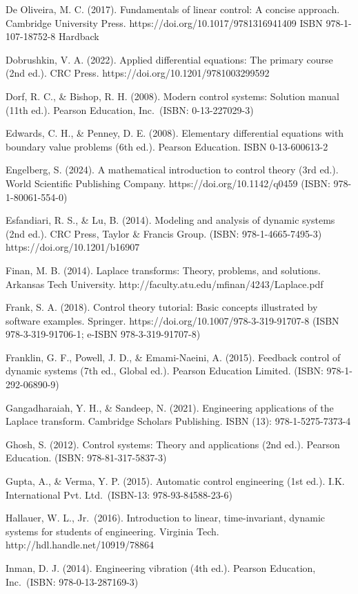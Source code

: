 \documentclass[
  11pt,
]{article}
\begin{document}
De Oliveira, M. C. (2017). Fundamentals of linear control: A concise
approach. Cambridge University Press.
https://doi.org/10.1017/9781316941409 ISBN 978-1-107-18752-8 Hardback

Dobrushkin, V. A. (2022). Applied differential equations: The primary
course (2nd ed.). CRC Press. https://doi.org/10.1201/9781003299592

Dorf, R. C., \& Bishop, R. H. (2008). Modern control systems: Solution
manual (11th ed.). Pearson Education, Inc.~(ISBN: 0-13-227029-3)

Edwards, C. H., \& Penney, D. E. (2008). Elementary differential
equations with boundary value problems (6th ed.). Pearson Education.
ISBN 0-13-600613-2

Engelberg, S. (2024). A mathematical introduction to control theory (3rd
ed.). World Scientific Publishing Company. https://doi.org/10.1142/q0459
(ISBN: 978-1-80061-554-0)

Esfandiari, R. S., \& Lu, B. (2014). Modeling and analysis of dynamic
systems (2nd ed.). CRC Press, Taylor \& Francis Group. (ISBN:
978-1-4665-7495-3) https://doi.org/10.1201/b16907

Finan, M. B. (2014). Laplace transforms: Theory, problems, and
solutions. Arkansas Tech University.
http://faculty.atu.edu/mfinan/4243/Laplace.pdf

Frank, S. A. (2018). Control theory tutorial: Basic concepts illustrated
by software examples. Springer.
https://doi.org/10.1007/978-3-319-91707-8 (ISBN 978-3-319-91706-1;
e-ISBN 978-3-319-91707-8)

Franklin, G. F., Powell, J. D., \& Emami-Naeini, A. (2015). Feedback
control of dynamic systems (7th ed., Global ed.). Pearson Education
Limited. (ISBN: 978-1-292-06890-9)

Gangadharaiah, Y. H., \& Sandeep, N. (2021). Engineering applications of
the Laplace transform. Cambridge Scholars Publishing. ISBN (13):
978-1-5275-7373-4

Ghosh, S. (2012). Control systems: Theory and applications (2nd ed.).
Pearson Education. (ISBN: 978-81-317-5837-3)

Gupta, A., \& Verma, Y. P. (2015). Automatic control engineering (1st
ed.). I.K. International Pvt. Ltd.~(ISBN-13: 978-93-84588-23-6)

Hallauer, W. L., Jr.~(2016). Introduction to linear, time-invariant,
dynamic systems for students of engineering. Virginia Tech.
http://hdl.handle.net/10919/78864

Inman, D. J. (2014). Engineering vibration (4th ed.). Pearson Education,
Inc.~(ISBN: 978-0-13-287169-3)
\end{document}
